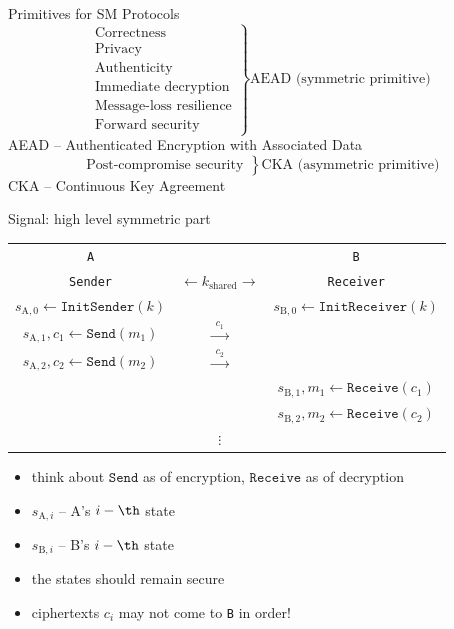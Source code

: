\documentclass[usenames,dvipsnames, 9pt]{beamer}
\begin{document}
\begin{frame}{Primitives for SM Protocols}
\Large
\[
	\left.
	\begin{array}{rrr}
		\text{Correctness}\\
		\text{Privacy}\\
		\text{Authenticity}\\
		\text{Immediate decryption} \\
		\text{Message-loss resilience}\\
		\text{Forward security}
	\end{array}
	\right\}\text{AEAD (symmetric primitive)}
	\]
AEAD -- Authenticated Encryption with Associated Data \\[20pt]
\[
\left.
\begin{array}{rrr}
\text{Post-compromise security}
\end{array}
\right\}\text{CKA (asymmetric primitive)}
\]
CKA -- Continuous Key Agreement
\end{frame}

\begin{frame}{Signal: high level symmetric part}
	\begin{center}
		\begin{tabular}{c c c }
			{\LARGE \color{Orange}\texttt{A}}&    & {\LARGE \color{Orange}\texttt{B}}  \\
			{\color{Orange}\texttt{Sender}}&   $\leftarrow k_{\text{shared}} \rightarrow $   & {\color{Orange}\texttt{Receiver}}  \pause \\[10pt]
			$s_{\text{A},0} \leftarrow \mathtt{InitSender}(k)$& & $s_{\text{B},0} \leftarrow \mathtt{InitReceiver}(k)$ \pause\\[10pt]
			$s_{\text{A},1}, c_1 \leftarrow \mathtt{Send}(m_1)$& $\xrightarrow{\hspace{5pt}c_1\hspace{5pt}}$ & \\
			$s_{\text{A},2}, c_2 \leftarrow \mathtt{Send}(m_2)$& $\xrightarrow{\hspace{5pt}c_2\hspace{5pt}}$ & \\
			& & $s_{\text{B},1}, m_1 \leftarrow \mathtt{Receive}(c_1)$ \\
			& & $s_{\text{B},2}, m_2 \leftarrow \mathtt{Receive}(c_2)$ \\
			& $\vdots $& \\
		\end{tabular}
	\end{center}
\pause 
\begin{itemize}
	\item think about $\mathtt{Send}$ as of encryption, $\mathtt{Receive}$ as of decryption
	\item $s_{\text{A},i}$ -- A's $i-\th$ state
	\item $s_{\text{B},i}$ -- B's $i-\th$ state
	\item the states should remain secure
	\item ciphertexts $c_i$ may not come to \texttt{B} in order!
\end{itemize}

\end{frame}
\end{document}
